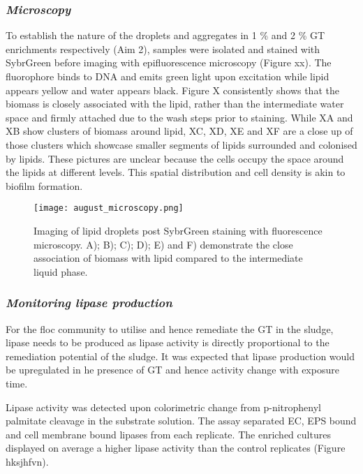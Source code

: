 \documentclass[11pt]{article}
\begin{document}
\subsubsection{\emph{Microscopy}}
To establish the nature of the droplets and aggregates in 1 \% and 2 \% GT enrichments respectively (Aim 2), samples were isolated and stained with SybrGreen before imaging with epifluorescence microscopy (Figure xx). The fluorophore binds to DNA and emits green light upon excitation while lipid appears yellow and water appears black. 
Figure X consistently shows that the biomass is closely associated with the lipid, rather than the intermediate water space and firmly attached due to the wash steps prior to staining.
While XA and XB show clusters of biomass around lipid, XC, XD, XE and XF are a close up of those clusters which showcase smaller segments of lipids surrounded and colonised by lipids. These pictures are unclear because the cells occupy the space around the lipids at different levels. This spatial distribution and cell density is akin to biofilm formation. 
\begin{figure}
\texttt{[image: august\_microscopy.png]}
\caption{Imaging of lipid droplets post SybrGreen staining with fluorescence microscopy. A); B); C); D); E) and F) demonstrate the close association of biomass with lipid compared to the intermediate liquid phase.}
\end{figure}

\FloatBarrier
\subsubsection{\emph{Monitoring lipase production}}
For the floc community to utilise and hence remediate the GT in the sludge, lipase needs to be produced as lipase activity is directly proportional to the remediation potential of the sludge. It was expected that lipase production would be upregulated in he presence of GT and hence activity change with exposure time.


Lipase activity was detected upon colorimetric change from p-nitrophenyl palmitate cleavage in the substrate solution. The assay separated  EC, EPS bound and cell membrane bound lipases from each replicate. The enriched cultures displayed on average a higher lipase activity than the control replicates (Figure hksjhfvn).
                                                                                                                                                                                                                                         
\end{document}
